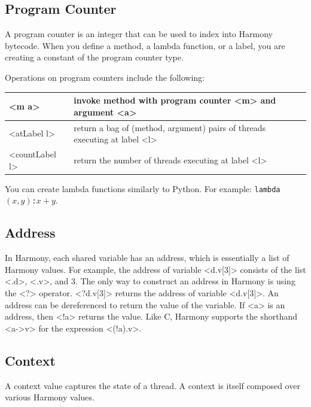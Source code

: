 \documentclass{report}
\begin{document}
\subsection*{Program Counter}

A program counter is an integer that can be used to index into Harmony
bytecode.  When you define a method, a lambda function, or a label,
you are creating a constant of the program counter type.

Operations on program counters include the following:
\begin{center}
\begin{tabular}{|l|l|}
\hline
<{m a}> & invoke method with program counter <{m}> and argument <{a}>\\
\hline
<{atLabel l}> & return a bag of (method, argument) pairs of threads executing at label <{l}> \\ \hline
<{countLabel l}> & return the number of threads executing at label <{l}> \\
\hline
\end{tabular}
\end{center}

You can create lambda functions similarly to Python.  For example:
\texttt{lambda$(x,y)$:$x+y$}.

\subsection*{Address}

In Harmony, each shared variable has an address, which is essentially
a list of Harmony values.
For example, the address of variable <{d.v[3]}> consists of the
list <{.d}>, <{.v}>, and 3.  The only way to construct an
address in Harmony is using the <{?}> operator.
<{?d.v[3]}> returns the address of variable <{d.v[3]}>.
An address can be dereferenced to return the value of the variable.
If <{a}> is an address, then <{!a}> returns the value.
Like C, Harmony supports the shorthand <{a->v}> for the expression <{(!a).v}>.

\subsection*{Context}

A context value captures the state of a thread.
A context is itself composed over various Harmony values.
\end{document}
